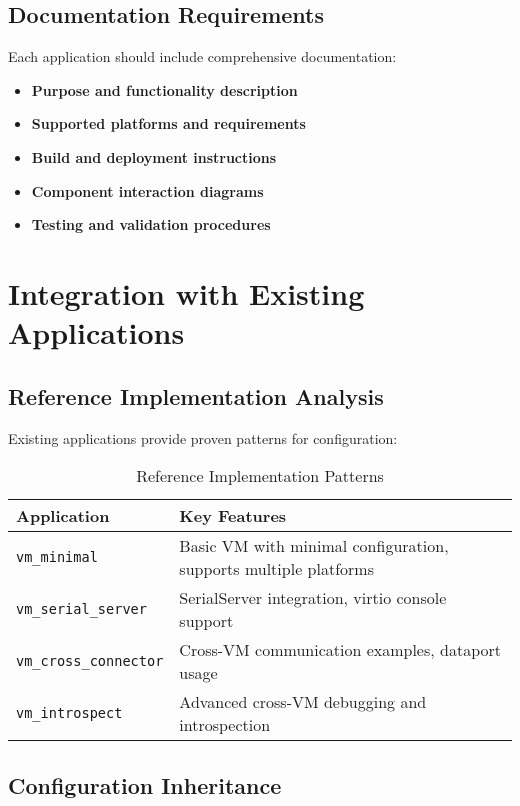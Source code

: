 \documentclass[12pt,a4paper]{article}
\begin{document}
\subsection{Documentation Requirements}

Each application should include comprehensive documentation:

\begin{itemize}
\item \textbf{Purpose and functionality description}
\item \textbf{Supported platforms and requirements}
\item \textbf{Build and deployment instructions}  
\item \textbf{Component interaction diagrams}
\item \textbf{Testing and validation procedures}
\end{itemize}

\section{Integration with Existing Applications}

\subsection{Reference Implementation Analysis}

Existing applications provide proven patterns for configuration:

\begin{table}[htbp]
\centering
\caption{Reference Implementation Patterns}
\label{tab:reference-patterns}
\begin{tabular}{@{}lp{8cm}@{}}
\toprule
Application & Key Features \\
\midrule
\texttt{vm\_minimal} & Basic VM with minimal configuration, supports multiple platforms \\
\texttt{vm\_serial\_server} & SerialServer integration, virtio console support \\
\texttt{vm\_cross\_connector} & Cross-VM communication examples, dataport usage \\
\texttt{vm\_introspect} & Advanced cross-VM debugging and introspection \\
\bottomrule
\end{tabular}
\end{table}

\subsection{Configuration Inheritance}
\end{document}
